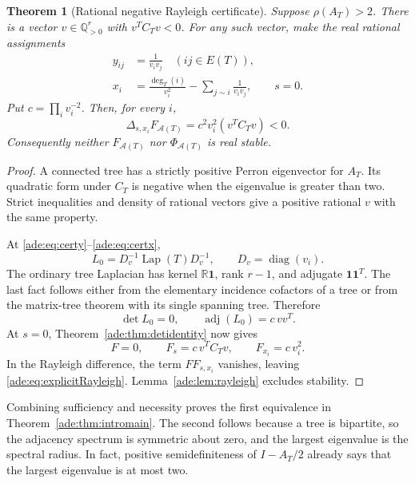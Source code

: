 \documentclass[11pt]{article}
\numberwithin{equation}{section}
\newtheorem{theorem}{Theorem}[section]
\theoremstyle{definition}
\newcommand{\R}{\mathbb R}
\newcommand{\one}{\mathbf 1}
\newcommand{\diag}{\operatorname{diag}}
\newcommand{\adj}{\operatorname{adj}}
\newcommand{\Lap}{\operatorname{Lap}}
\newcommand{\calA}{\mathcal A}
\newcommand{\del}{\Delta}
\begin{document}
\begin{theorem}[Rational negative Rayleigh certificate]
\label{ade:thm:negative}
Suppose $\rho(A_T)>2$.  There is a vector $v\in\mathbb Q_{>0}^{r}$ with
$v^TC_Tv<0$.  For any such vector, make the real rational assignments
\begin{align}
 y_{ij}&=\frac1{v_iv_j}\quad(ij\in E(T)),\label{ade:eq:certy}\\
 x_i&=\frac{\deg_T(i)}{v_i^2}
         -\sum_{j\sim i}\frac1{v_iv_j},\qquad s=0.
 \label{ade:eq:certx}
\end{align}
Put $c=\prod_i v_i^{-2}$.  Then, for every $i$,
\begin{equation}
 \del_{s,x_i}F_{\calA(T)}
 =c^2v_i^2(v^TC_Tv)<0.
 \label{ade:eq:explicitRayleigh}
\end{equation}
Consequently neither $F_{\calA(T)}$ nor $\Phi_{\calA(T)}$ is real stable.
\end{theorem}
\begin{proof}
A connected tree has a strictly positive Perron eigenvector for $A_T$.
Its quadratic form under $C_T$ is negative when the eigenvalue is greater
than two.  Strict inequalities and density of rational vectors give a
positive rational $v$ with the same property.

At \eqref{ade:eq:certy}--\eqref{ade:eq:certx},
\begin{equation}
 L_0=D_v^{-1}\Lap(T)D_v^{-1},\qquad D_v=\diag(v_i).
 \label{ade:eq:rankdeficient}
\end{equation}
The ordinary tree Laplacian has kernel $\R\one$, rank $r-1$, and
adjugate $\one\one^T$.  The last fact follows either from the elementary
incidence cofactors of a tree or from the matrix-tree theorem with its
single spanning tree.  Therefore
\begin{equation}
 \det L_0=0,\qquad \adj(L_0)=c\,vv^T.
 \label{ade:eq:adjrankone}
\end{equation}
At $s=0$, Theorem~\ref{ade:thm:detidentity} now gives
\[
 F=0,\qquad F_s=c\,v^TC_Tv,\qquad F_{x_i}=c\,v_i^2.
\]
In the Rayleigh difference, the term $FF_{s,x_i}$ vanishes, leaving
\eqref{ade:eq:explicitRayleigh}.  Lemma~\ref{ade:lem:rayleigh} excludes stability.
\end{proof}

Combining sufficiency and necessity proves the first equivalence in
Theorem~\ref{ade:thm:intromain}.  The second follows because a tree is
bipartite, so the adjacency spectrum is symmetric about zero, and the
largest eigenvalue is the spectral radius.  In fact, positive
semidefiniteness of $I-A_T/2$ already says that the largest eigenvalue is
at most two.
\end{document}
